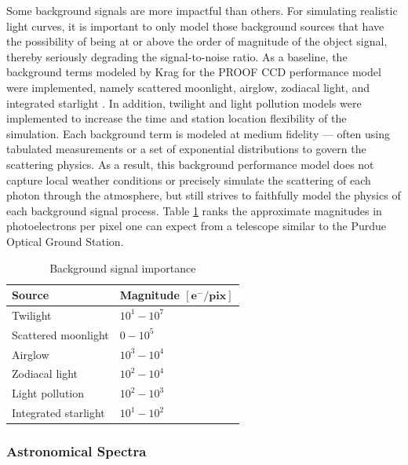 Some background signals are more impactful than others. For simulating realistic light curves, it is important to only model those background sources that have the possibility of being at or above the order of magnitude of the object signal, thereby seriously degrading the signal-to-noise ratio. As a baseline, the background terms modeled by Krag for the PROOF CCD performance model were implemented, namely scattered moonlight, airglow, zodiacal light, and integrated starlight \cite{krag2003}. In addition, twilight and light pollution models were implemented to increase the time and station location flexibility of the simulation. Each background term is modeled at medium fidelity --- often using tabulated measurements or a set of exponential distributions to govern the scattering physics. As a result, this background performance model does not capture local weather conditions or precisely simulate the scattering of each photon through the atmosphere, but still strives to faithfully model the physics of each background signal process. Table \ref{tb:signal_importance} ranks the approximate magnitudes in photoelectrons per pixel one can expect from a telescope similar to the Purdue Optical Ground Station.

\begin{table}[]
  \centering
  \begin{tabular}{|l|l|}
  \hline
  \textbf{Source} & \textbf{Magnitude} $\mathbf{\left[ e^- / \textbf{pix}\right]}$ \\ \hline
  Twilight               & $10^1 - 10^7$                              \\ \hline
  Scattered moonlight    & $0 - 10^5$                                 \\ \hline
  Airglow                & $10^3 - 10^4$                              \\ \hline
  Zodiacal light         & $10^2 - 10^4$                              \\ \hline
  Light pollution        & $10^2 - 10^3$                              \\ \hline
  Integrated starlight   & $10^1 - 10^2$                              \\ \hline
  \end{tabular}
  \caption{Background signal importance}
  \label{tb:signal_importance}
\end{table}

\subsubsection{Astronomical Spectra}

